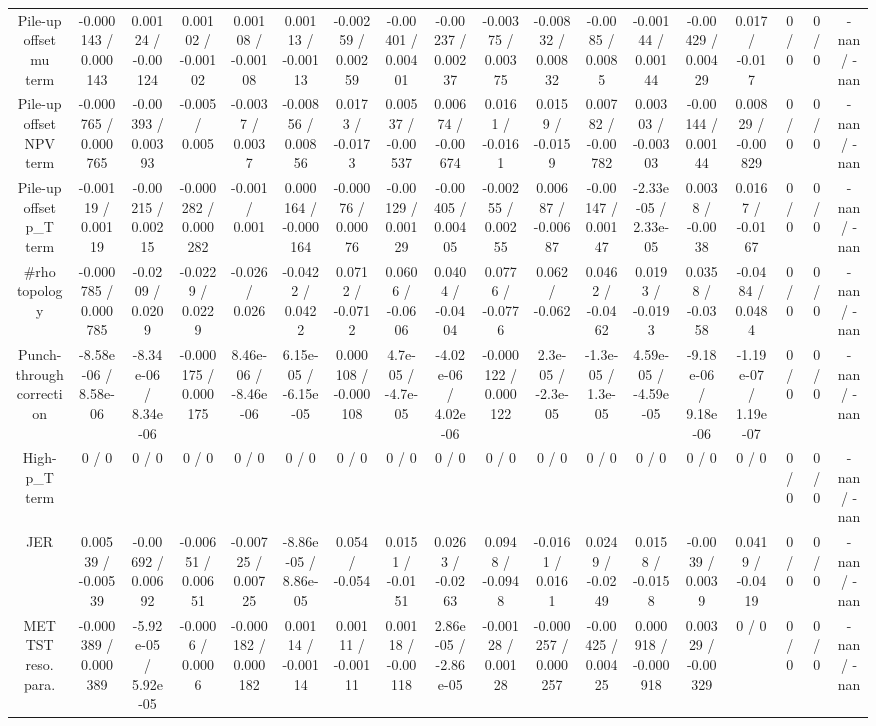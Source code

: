 \documentclass[10pt]{article}
\begin{document}
\begin{table}[htbp]
\begin{center}
\begin{tabular}{|c|c|c|c|c|c|c|c|c|c|c|c|c|c|c|c|c|c|}
  Pile-up offset mu term & -0.000143 / 0.000143 & 0.00124 / -0.00124 & 0.00102 / -0.00102 & 0.00108 / -0.00108 & 0.00113 / -0.00113 & -0.00259 / 0.00259 & -0.00401 / 0.00401 & -0.00237 / 0.00237 & -0.00375 / 0.00375 & -0.00832 / 0.00832 & -0.0085 / 0.0085 & -0.00144 / 0.00144 & -0.00429 / 0.00429 & 0.017 / -0.017 & 0 / 0 & 0 / 0 & -nan / -nan \\ 
  Pile-up offset NPV term & -0.000765 / 0.000765 & -0.00393 / 0.00393 & -0.005 / 0.005 & -0.0037 / 0.0037 & -0.00856 / 0.00856 & 0.0173 / -0.0173 & 0.00537 / -0.00537 & 0.00674 / -0.00674 & 0.0161 / -0.0161 & 0.0159 / -0.0159 & 0.00782 / -0.00782 & 0.00303 / -0.00303 & -0.00144 / 0.00144 & 0.00829 / -0.00829 & 0 / 0 & 0 / 0 & -nan / -nan \\ 
  Pile-up offset p_{T} term & -0.00119 / 0.00119 & -0.00215 / 0.00215 & -0.000282 / 0.000282 & -0.001 / 0.001 & 0.000164 / -0.000164 & -0.00076 / 0.00076 & -0.00129 / 0.00129 & -0.00405 / 0.00405 & -0.00255 / 0.00255 & 0.00687 / -0.00687 & -0.00147 / 0.00147 & -2.33e-05 / 2.33e-05 & 0.0038 / -0.0038 & 0.0167 / -0.0167 & 0 / 0 & 0 / 0 & -nan / -nan \\ 
  #rho topology & -0.000785 / 0.000785 & -0.0209 / 0.0209 & -0.0229 / 0.0229 & -0.026 / 0.026 & -0.0422 / 0.0422 & 0.0712 / -0.0712 & 0.0606 / -0.0606 & 0.0404 / -0.0404 & 0.0776 / -0.0776 & 0.062 / -0.062 & 0.0462 / -0.0462 & 0.0193 / -0.0193 & 0.0358 / -0.0358 & -0.0484 / 0.0484 & 0 / 0 & 0 / 0 & -nan / -nan \\ 
  Punch-through correction & -8.58e-06 / 8.58e-06 & -8.34e-06 / 8.34e-06 & -0.000175 / 0.000175 & 8.46e-06 / -8.46e-06 & 6.15e-05 / -6.15e-05 & 0.000108 / -0.000108 & 4.7e-05 / -4.7e-05 & -4.02e-06 / 4.02e-06 & -0.000122 / 0.000122 & 2.3e-05 / -2.3e-05 & -1.3e-05 / 1.3e-05 & 4.59e-05 / -4.59e-05 & -9.18e-06 / 9.18e-06 & -1.19e-07 / 1.19e-07 & 0 / 0 & 0 / 0 & -nan / -nan \\ 
  High-p_{T} term & 0 / 0 & 0 / 0 & 0 / 0 & 0 / 0 & 0 / 0 & 0 / 0 & 0 / 0 & 0 / 0 & 0 / 0 & 0 / 0 & 0 / 0 & 0 / 0 & 0 / 0 & 0 / 0 & 0 / 0 & 0 / 0 & -nan / -nan \\ 
  JER & 0.00539 / -0.00539 & -0.00692 / 0.00692 & -0.00651 / 0.00651 & -0.00725 / 0.00725 & -8.86e-05 / 8.86e-05 & 0.054 / -0.054 & 0.0151 / -0.0151 & 0.0263 / -0.0263 & 0.0948 / -0.0948 & -0.0161 / 0.0161 & 0.0249 / -0.0249 & 0.0158 / -0.0158 & -0.0039 / 0.0039 & 0.0419 / -0.0419 & 0 / 0 & 0 / 0 & -nan / -nan \\ 
  MET TST reso. para. & -0.000389 / 0.000389 & -5.92e-05 / 5.92e-05 & -0.0006 / 0.0006 & -0.000182 / 0.000182 & 0.00114 / -0.00114 & 0.00111 / -0.00111 & 0.00118 / -0.00118 & 2.86e-05 / -2.86e-05 & -0.00128 / 0.00128 & -0.000257 / 0.000257 & -0.00425 / 0.00425 & 0.000918 / -0.000918 & 0.00329 / -0.00329 & 0 / 0 & 0 / 0 & 0 / 0 & -nan / -nan \\ 

\end{tabular}
\end{center}
\end{table}
\end{document}
